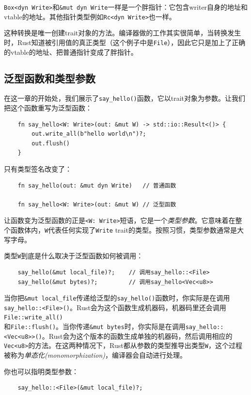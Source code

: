 \texttt{Box<dyn Write>}和\texttt{\&mut dyn Write}一样是一个胖指针：它包含writer自身的地址和\\
vtable的地址。其他指针类型例如\texttt{Rc<dyn Write>}也一样。

这种转换是唯一创建trait对象的方法。编译器做的工作其实很简单，当转换发生时，Rust知道被引用值的真正类型（这个例子中是\texttt{File}），因此它只是加上了正确的vtable的地址、把普通指针变成了胖指针。

\subsection{泛型函数和类型参数}
在这一章的开始处，我们展示了\texttt{say\_hello()}函数，它以trait对象为参数。让我们把这个函数重写为泛型函数：
\begin{verbatim}
    fn say_hello<W: Write>(out: &mut W) -> std::io::Result<()> {
        out.write_all(b"hello world\n")?;
        out.flush()
    }
\end{verbatim}

只有类型签名改变了：
\begin{verbatim}
    fn say_hello(out: &mut dyn Write)   // 普通函数

    fn say_hello<W: Write>(out: &mut W) // 泛型函数
\end{verbatim}

让函数变为泛型函数的正是\texttt{<W: Write>}短语，它是一个\emph{类型参数}。它意味着在整个函数体内，\texttt{W}代表任何实现了\texttt{Write} trait的类型。按照习惯，类型参数通常是大写字母。

类型\texttt{W}到底是什么取决于泛型函数如何被调用：
\begin{verbatim}
    say_hello(&mut local_file)?;    // 调用say_hello::<File>
    say_hello(&mut bytes)?;         // 调用say_hello<Vec<u8>>
\end{verbatim}

当你把\texttt{\&mut local\_file}传递给泛型的\texttt{say\_hello()}函数时，你实际是在调用\\
\texttt{say\_hello::<File>()}。Rust会为这个函数生成机器码，机器码里还会调用\texttt{File::write\_all()}\\
和\texttt{File::flush()}。当你传递\texttt{\&mut bytes}时，你实际是在调用\texttt{say\_hello::<Vec<u8>>()}。Rust会为这个版本的函数生成单独的机器码，然后调用相应的\texttt{Vec<u8>}的方法。在这两种情况下，Rust都从参数的类型推导出类型\texttt{W}，这个过程被称为\emph{单态化(monomorphization)}，编译器会自动进行处理。

你也可以指明类型参数：
\begin{verbatim}
    say_hello::<File>(&mut local_file)?;
\end{verbatim}

